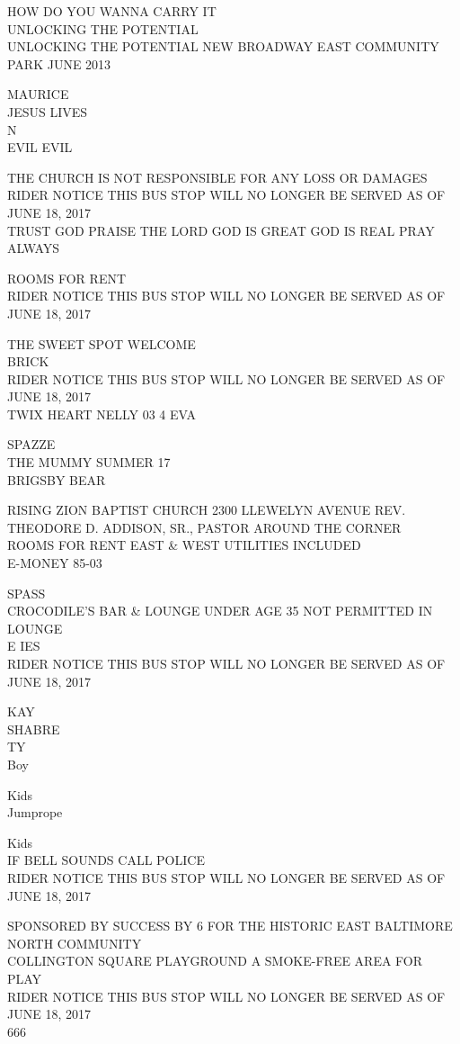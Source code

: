\documentclass[10pt,letterpaper]{article}
\begin{document}
HOW DO YOU WANNA CARRY IT\\
UNLOCKING THE POTENTIAL\\
UNLOCKING THE POTENTIAL NEW BROADWAY EAST COMMUNITY PARK JUNE 2013

MAURICE\\
JESUS LIVES\\
N\\
EVIL EVIL

THE CHURCH IS NOT RESPONSIBLE FOR ANY LOSS OR DAMAGES\\
RIDER NOTICE THIS BUS STOP WILL NO LONGER BE SERVED AS OF JUNE 18, 2017\\
TRUST GOD PRAISE THE LORD GOD IS GREAT GOD IS REAL PRAY ALWAYS

ROOMS FOR RENT\\
RIDER NOTICE THIS BUS STOP WILL NO LONGER BE SERVED AS OF JUNE 18, 2017

THE SWEET SPOT WELCOME\\
BRICK\\
RIDER NOTICE THIS BUS STOP WILL NO LONGER BE SERVED AS OF JUNE 18, 2017\\
TWIX HEART NELLY 03 4 EVA

SPAZZE\\
THE MUMMY SUMMER 17\\
BRIGSBY BEAR

RISING ZION BAPTIST CHURCH 2300 LLEWELYN AVENUE REV. THEODORE D. ADDISON, SR., PASTOR AROUND THE CORNER\\
ROOMS FOR RENT EAST \& WEST UTILITIES INCLUDED\\
E{-}MONEY 85{-}03

SPASS\\
CROCODILE'S BAR \& LOUNGE UNDER AGE 35 NOT PERMITTED IN LOUNGE\\
E IES\\
RIDER NOTICE THIS BUS STOP WILL NO LONGER BE SERVED AS OF JUNE 18, 2017

KAY\\
SHABRE\\
TY\\
Boy

Kids\\
Jumprope

Kids\\
IF BELL SOUNDS CALL POLICE\\
RIDER NOTICE THIS BUS STOP WILL NO LONGER BE SERVED AS OF JUNE 18, 2017

SPONSORED BY SUCCESS BY 6 FOR THE HISTORIC EAST BALTIMORE NORTH COMMUNITY\\
COLLINGTON SQUARE PLAYGROUND A SMOKE{-}FREE AREA FOR PLAY\\
RIDER NOTICE THIS BUS STOP WILL NO LONGER BE SERVED AS OF JUNE 18, 2017\\
666
\end{document}
